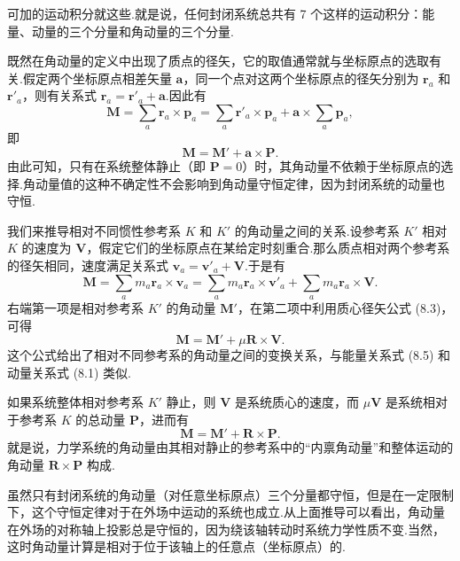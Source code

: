 可加的运动积分就这些.就是说，任何封闭系统总共有 7 个这样的运动积分：能量、动量的三个分量和角动量的三个分量.

既然在角动量的定义中出现了质点的径矢，它的取值通常就与坐标原点的选取有关.假定两个坐标原点相差矢量 $\boldsymbol{a}$，同一个点对这两个坐标原点的径矢分别为 $\boldsymbol{r}_a$ 和 $\boldsymbol{r}'_a$，则有关系式 $\boldsymbol{r}_a=\boldsymbol{r}'_a+\boldsymbol{a}$.因此有
\begin{equation*}
  \boldsymbol{M}=\sum_a\boldsymbol{r}_a\times\boldsymbol{p}_a
  =\sum_a\boldsymbol{r}'_a\times\boldsymbol{p}_a
  +\boldsymbol{a}\times\sum_a\boldsymbol{p}_a,
\end{equation*}
即
\begin{equation}
  \boldsymbol{M}=\boldsymbol{M}'+\boldsymbol{a}\times\boldsymbol{P}.
\end{equation}
由此可知，只有在系统整体静止（即 $\boldsymbol{P}=0$）时，其角动量不依赖于坐标原点的选择.角动量值的这种不确定性不会影响到角动量守恒定律，因为封闭系统的动量也守恒.

我们来推导相对不同惯性参考系 $K$ 和 $K'$ 的角动量之间的关系.设参考系 $K'$ 相对 $K$ 的速度为 $\boldsymbol{V}$，假定它们的坐标原点在某给定时刻重合.那么质点相对两个参考系的径矢相同，速度满足关系式 $\boldsymbol{v}_a=\boldsymbol{v}'_a+\boldsymbol{V}$.于是有
\begin{equation*}
  \boldsymbol{M}=\sum_a m_a\boldsymbol{r}_a\times\boldsymbol{v}_a
  =\sum_a m_a\boldsymbol{r}_a\times\boldsymbol{v}'_a
  +\sum_a m_a\boldsymbol{r}_a\times\boldsymbol{V}.
\end{equation*}
右端第一项是相对参考系 $K'$ 的角动量 $\boldsymbol{M}'$，在第二项中利用质心径矢公式 (8.3)，可得
\begin{equation}
  \boldsymbol{M}=\boldsymbol{M}'+\mu\boldsymbol{R}\times\boldsymbol{V}.
\end{equation}
这个公式给出了相对不同参考系的角动量之间的变换关系，与能量关系式 (8.5) 和动量关系式 (8.1) 类似.

如果系统整体相对参考系 $K'$ 静止，则 $\boldsymbol{V}$ 是系统质心的速度，而 $\mu\boldsymbol{V}$ 是系统相对于参考系 $K$ 的总动量 $\boldsymbol{P}$，进而有
\begin{equation}
  \boldsymbol{M}=\boldsymbol{M}'+\boldsymbol{R}\times\boldsymbol{P}.
\end{equation}
就是说，力学系统的角动量由其相对静止的参考系中的“内禀角动量”和整体运动的角动量 $\boldsymbol{R}\times\boldsymbol{P}$ 构成.

虽然只有封闭系统的角动量（对任意坐标原点）三个分量都守恒，但是在一定限制下，这个守恒定律对于在外场中运动的系统也成立.从上面推导可以看出，角动量在外场的对称轴上投影总是守恒的，因为绕该轴转动时系统力学性质不变.当然，这时角动量计算是相对于位于该轴上的任意点（坐标原点）的.

